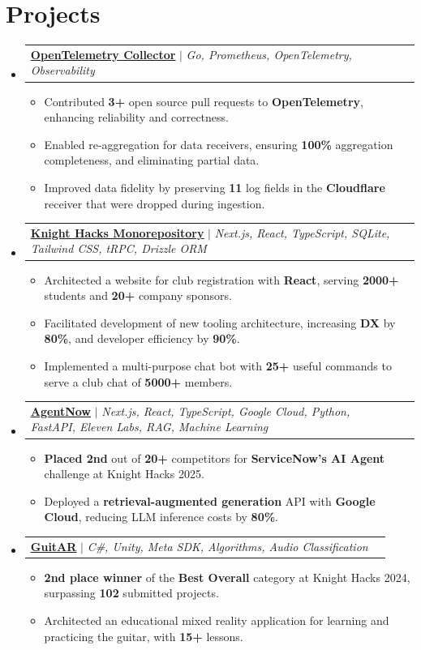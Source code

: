 \documentclass[letterpaper,11pt]{article}
\makeatletter
\newcommand{\resumeItem}[1]{
  \item\small{
    {#1 \vspace{-2pt}}
  }
}
\newcommand{\resumeProjectHeading}[2]{
    \item
    \begin{tabular*}{0.97\textwidth}{l@{\extracolsep{\fill}}r}
      \small#1\\
    \end{tabular*}\vspace{-7pt}
}
\newcommand{\resumeSubHeadingListStart}{\begin{itemize}[leftmargin=0.15in, label={}]}
\newcommand{\resumeSubHeadingListEnd}{\end{itemize}}
\newcommand{\resumeItemListStart}{\begin{itemize}}
\newcommand{\resumeItemListEnd}{\end{itemize}\vspace{-7pt}}
\makeatother
\begin{document}
\section{Projects}
    \resumeSubHeadingListStart
      \resumeProjectHeading
        {\textbf{\href{https://github.com/open-telemetry/opentelemetry-collector-contrib}{\underline{OpenTelemetry Collector}}} $|$ \emph{Go, Prometheus, OpenTelemetry, Observability}}{June 2021 -- Present}
          \resumeItemListStart
            \resumeItem{Contributed \textbf{3+} open source pull requests to \textbf{OpenTelemetry}, enhancing reliability and correctness.}
            \resumeItem{Enabled re-aggregation for data receivers, ensuring \textbf{100\%} aggregation completeness, and eliminating partial data.}
            \resumeItem{Improved data fidelity by preserving \textbf{11} log fields in the \textbf{Cloudflare} receiver that were dropped during ingestion.}
          \resumeItemListEnd
        \resumeProjectHeading
        {\textbf{\href{https://github.com/KnightHacks/forge}{\underline{Knight Hacks Monorepository}}} $|$ \emph{Next.js, React, TypeScript, SQLite, Tailwind CSS, tRPC, Drizzle ORM}}{June 2021 -- Present}
            \resumeItemListStart
            \resumeItem{Architected a website for club registration with \textbf{React}, serving \textbf{2000+} students and \textbf{20+} company sponsors.}
            \resumeItem{Facilitated development of new tooling architecture, increasing \textbf{DX} by \textbf{80\%}, and developer efficiency by \textbf{90\%}.}
            \resumeItem{Implemented a multi-purpose chat bot with \textbf{25+} useful commands to serve a club chat of \textbf{5000+} members.}
        \resumeItemListEnd
      \resumeProjectHeading
        {\textbf{\href{https://devpost.com/software/agentnow}{\underline{AgentNow}}} $|$ \emph{Next.js, React, TypeScript, Google Cloud, Python, FastAPI, Eleven Labs, RAG, Machine Learning}}{June 2021 -- Present}
          \resumeItemListStart
            \resumeItem{\textbf{Placed 2nd} out of \textbf{20+} competitors for \textbf{ServiceNow's AI Agent} challenge at Knight Hacks 2025.}
            \resumeItem{Deployed a \textbf{retrieval-augmented generation} API with \textbf{Google Cloud}, reducing LLM inference costs by \textbf{80\%}.}
          \resumeItemListEnd
        \resumeProjectHeading
        {\textbf{\href{https://devpost.com/software/guitar-o3gw19}{\underline{GuitAR}}} $|$ \emph{C\#, Unity, Meta SDK, Algorithms, Audio Classification}}{June 2021 -- Present}
        \resumeItemListStart
          \resumeItem{\textbf{2nd place winner} of the \textbf{Best Overall} category at Knight Hacks 2024, surpassing \textbf{102} submitted projects.}
          \resumeItem{Architected an educational mixed reality application for learning and practicing the guitar, with \textbf{15+} lessons.}
        \resumeItemListEnd
    \resumeSubHeadingListEnd
%
\end{document}
